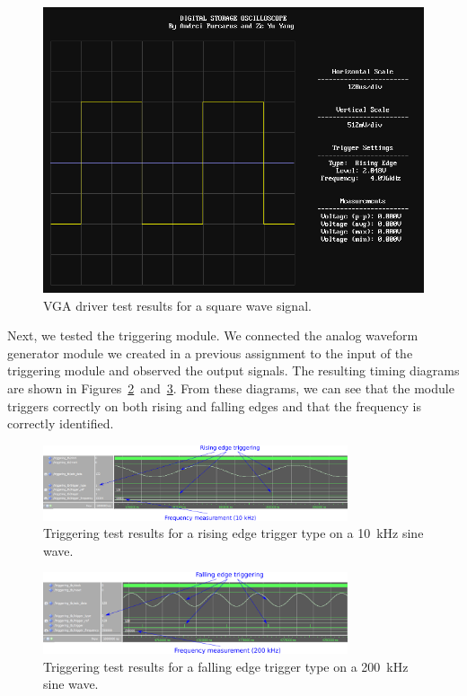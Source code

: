 \documentclass[journal,hidelinks]{IEEEtran}
\begin{document}
\begin{figure}[!htb]
  \centering
  \includegraphics[width=\columnwidth]{test-results/vga_test_signal2.png}
  \caption{VGA driver test results for a square wave signal.}
  \label{fig:vga_test_2}
\end{figure}

Next, we tested the triggering module. We connected the analog waveform generator module we created in a previous assignment to the input of the triggering module and observed the output signals. The resulting timing diagrams are shown in Figures~\ref{fig:trigger_test_1}~and~\ref{fig:trigger_test_2}. From these diagrams, we can see that the module triggers correctly on both rising and falling edges and that the frequency is correctly identified.

\begin{figure}[!htb]
  \centering
  \includegraphics[width=0.8\textwidth]{test-results/trigger_test_rising_10kHz.png}
  \caption{Triggering test results for a rising edge trigger type on a 10~kHz sine wave.}
  \label{fig:trigger_test_1}
\end{figure}

\begin{figure}[!htb]
  \centering
  \includegraphics[width=0.8\textwidth]{test-results/trigger_test_falling_200kHz.png}
  \caption{Triggering test results for a falling edge trigger type on a 200~kHz sine wave.}
  \label{fig:trigger_test_2}
\end{figure}
\end{document}
